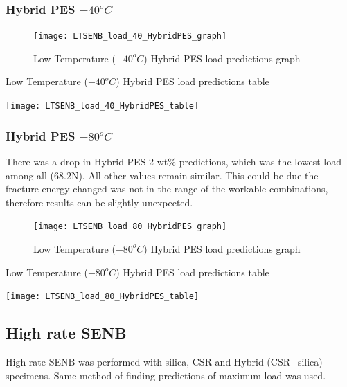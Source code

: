 \documentclass[numbers=noendperiod,chapterprefix=on]{icldt} %
\begin{document}
 \subsubsection{Hybrid PES $ -40 ^{o}C$}
 
 \begin{figure}[!hp]
   \centering
   \texttt{[image: LTSENB\_load\_40\_HybridPES\_graph]}\label{LTSENB_load_40_HybridPES_graph}
   \caption{Low Temperature ($ -40 ^{o}C$) Hybrid PES load predictions graph}
   \end{figure}
  \FloatBarrier
  
  \begin{table}
     \centering
     \caption{Low Temperature ($ -40 ^{o}C$) Hybrid PES load predictions table}\label{LTSENB_load_40_HybridPES_table}
     \texttt{[image: LTSENB\_load\_40\_HybridPES\_table]}
     \end{table}
     \FloatBarrier

\subsubsection{Hybrid PES $ -80 ^{o}C$}
 There was a drop in Hybrid PES 2 wt\% predictions, which was the lowest load among all (68.2N). All other values remain similar. This could be due the fracture energy changed was not in the range of the workable combinations, therefore results can be slightly unexpected.
 
 \begin{figure}[!hp]
   \centering
   \texttt{[image: LTSENB\_load\_80\_HybridPES\_graph]}\label{LTSENB_load_80_HybridPES_graph}
   \caption{Low Temperature ($ -80 ^{o}C$) Hybrid PES load predictions graph}
   \end{figure}
  \FloatBarrier
  
  \begin{table}
     \centering
     \caption{Low Temperature ($ -80 ^{o}C$) Hybrid PES load predictions table}\label{LTSENB_load_80_HybridPES_table}
     \texttt{[image: LTSENB\_load\_80\_HybridPES\_table]}
     \end{table}
     \FloatBarrier      



      
\subsection{High rate SENB}
High rate SENB was performed with silica, CSR and Hybrid (CSR+silica) specimens. Same method of finding predictions of maximum load was used.
\end{document}
